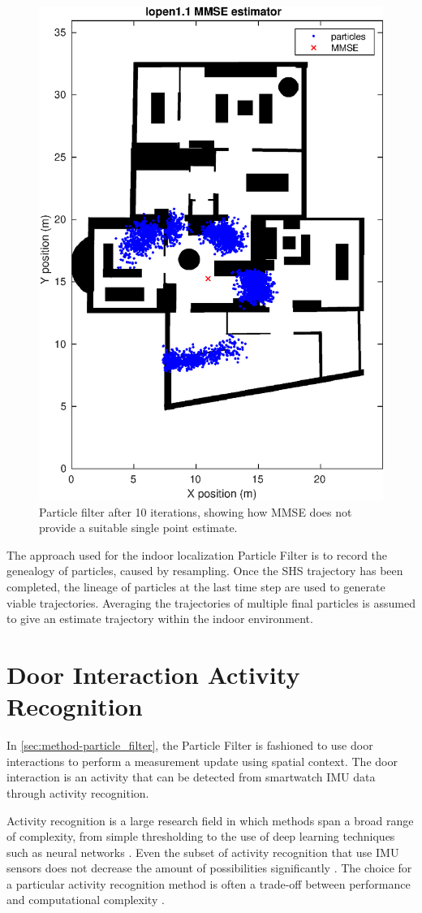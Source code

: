 \begin{figure}[H]
	\centering
	\includegraphics[width=0.35\linewidth]{images/20201108_1751_lopen1_1_MMSE_estimator}
	\caption{Particle filter after 10 iterations, showing how MMSE does not provide a suitable single point estimate.}
	\label{fig:lopen_11_mmse_estimator}
\end{figure}

The approach used for the indoor localization Particle Filter is to record the genealogy of particles, caused by resampling. Once the \ac{SHS} trajectory has been completed, the lineage of particles at the last time step are used to generate viable trajectories. Averaging the trajectories of multiple final particles is assumed to give an estimate trajectory within the indoor environment.
\newpage
\section{Door Interaction Activity Recognition}
\label{sec:method-AR}

In \cref{sec:method-particle_filter}, the Particle Filter is fashioned to use door interactions to perform a measurement update using spatial context. The door interaction is an activity that can be detected from smartwatch IMU data through activity recognition. \par 

Activity recognition is a large research field in which methods span a broad range of complexity, from simple thresholding to the use of deep learning techniques such as neural networks  \cite{Lima2019}. Even the subset of activity recognition that use \ac{IMU} sensors does not decrease the amount of possibilities significantly \cite{cornacchia2016survey}. The choice for a particular activity recognition method is often a trade-off between performance and computational complexity \cite{Bulling2014}. \par 

